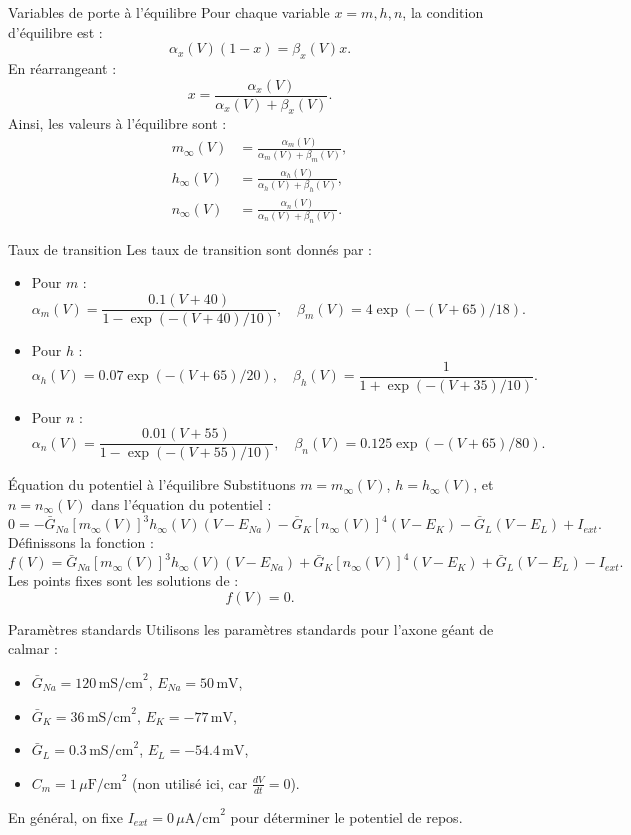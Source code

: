 \documentclass[10pt,french]{beamer}
\begin{document}
	\begin{frame}{Variables de porte à l'équilibre}
		Pour chaque variable \( x = m, h, n \), la condition d'équilibre est :
		\[
		\alpha_x(V) (1 - x) = \beta_x(V) x.
		\]
		En réarrangeant :
		\[
		x = \frac{\alpha_x(V)}{\alpha_x(V) + \beta_x(V)}.
		\]
		Ainsi, les valeurs à l'équilibre sont :
		\begin{align*}
			m_\infty(V) &= \frac{\alpha_m(V)}{\alpha_m(V) + \beta_m(V)}, \\
			h_\infty(V) &= \frac{\alpha_h(V)}{\alpha_h(V) + \beta_h(V)}, \\
			n_\infty(V) &= \frac{\alpha_n(V)}{\alpha_n(V) + \beta_n(V)}.
		\end{align*}
	\end{frame}
	
	\begin{frame}{Taux de transition}
		\small
		Les taux de transition sont donnés par :
		\begin{itemize}
			\item Pour \( m \) :
			\[
			\alpha_m(V) = \frac{0.1 (V + 40)}{1 - \exp(-(V + 40)/10)}, \quad \beta_m(V) = 4 \exp(-(V + 65)/18).
			\]
			\item Pour \( h \) :
			\[
			\alpha_h(V) = 0.07 \exp(-(V + 65)/20), \quad \beta_h(V) = \frac{1}{1 + \exp(-(V + 35)/10)}.
			\]
			\item Pour \( n \) :
			\[
			\alpha_n(V) = \frac{0.01 (V + 55)}{1 - \exp(-(V + 55)/10)}, \quad \beta_n(V) = 0.125 \exp(-(V + 65)/80).
			\]
		\end{itemize}
	\end{frame}
	
	\begin{frame}{Équation du potentiel à l'équilibre}
		\small
		Substituons \( m = m_\infty(V) \), \( h = h_\infty(V) \), et \( n = n_\infty(V) \) dans l'équation du potentiel :
		\[
		0 = -\bar{G}_{Na} [m_\infty(V)]^3 h_\infty(V) (V - E_{Na}) - \bar{G}_K [n_\infty(V)]^4 (V - E_K) - \bar{G}_L (V - E_L) + I_{ext}.
		\]
		Définissons la fonction :
		\[
		f(V) = \bar{G}_{Na} [m_\infty(V)]^3 h_\infty(V) (V - E_{Na}) + \bar{G}_K [n_\infty(V)]^4 (V - E_K) + \bar{G}_L (V - E_L) - I_{ext}.
		\]
		Les points fixes sont les solutions de :
		\[
		f(V) = 0.
		\]
	\end{frame}
	
	\begin{frame}{Paramètres standards}
		Utilisons les paramètres standards pour l'axone géant de calmar :
		\begin{itemize}
			\item \( \bar{G}_{Na} = 120 \, \text{mS/cm}^2 \), \( E_{Na} = 50 \, \text{mV} \),
			\item \( \bar{G}_K = 36 \, \text{mS/cm}^2 \), \( E_K = -77 \, \text{mV} \),
			\item \( \bar{G}_L = 0.3 \, \text{mS/cm}^2 \), \( E_L = -54.4 \, \text{mV} \),
			\item \( C_m = 1 \, \mu\text{F/cm}^2 \) (non utilisé ici, car \( \frac{dV}{dt} = 0 \)).
		\end{itemize}
		En général, on fixe \( I_{ext} = 0 \, \mu\text{A/cm}^2 \) pour déterminer le potentiel de repos.
	\end{frame}
	
\end{document}
